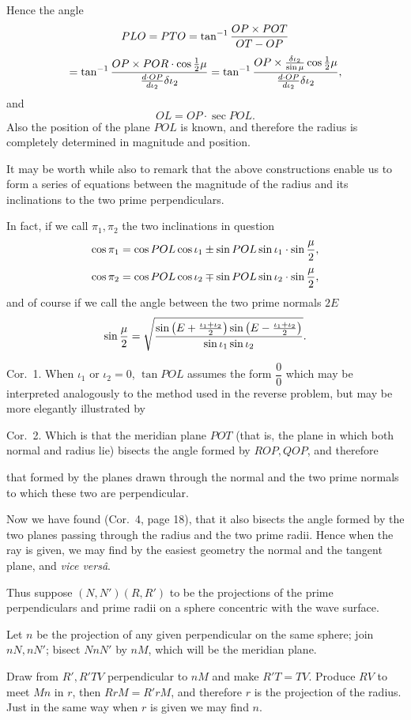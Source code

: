 \documentclass[11pt]{article}
\newcommand{\sourcepage}[1]{\marginpar{\scriptsize p.~#1}}
\begin{document}
Hence the angle
\[
 PLO=PTO=\tan^{-1}{OP\times POT\over OT-OP}
\]
\[
 =\tan^{-1}{OP\times POR\cdot\cos {1\over2}\mu\over {d\cdot OP\over d\iota_2}\delta\iota_2}
 =\tan^{-1}{OP\times {\delta\iota_2\over\sin\mu}\cos {1\over2}\mu\over {d\cdot OP\over d\iota_2}\delta\iota_2},
\]
and
\[
 OL=OP\cdot \sec POL.
\]
Also the position of the plane $POL$ is known, and therefore the radius is completely determined in magnitude and position.

It may be worth while also to remark that the above constructions enable us to form a series of equations between the magnitude of the radius and its inclinations to the two prime perpendiculars.

In fact, if we call $\pi_1,\pi_2$ the two inclinations in question
\[
 \cos\pi_1=\cos POL\cos\iota_1\pm\sin POL\sin\iota_1\cdot\sin{\mu\over2},
\]
\[
 \cos\pi_2=\cos POL\cos\iota_2\mp\sin POL\sin\iota_2\cdot\sin{\mu\over2},
\]
and of course if we call the angle between the two prime normals $2E$
\[
 \sin{\mu\over2}=\sqrt{\frac{
 \sin\left(E+{\iota_1+\iota_2\over2}\right)
 \sin\left(E-{\iota_1+\iota_2\over2}\right)}
 {\sin\iota_1\sin\iota_2}}.
\]

Cor.~1. When $\iota_1$ or $\iota_2=0$, $\tan POL$ assumes the form $\dfrac00$ which may be interpreted analogously to the method used in the reverse problem, but may be more elegantly illustrated by

Cor.~2. Which is that the meridian plane $POT$ (that is, the plane in which both normal and radius lie) bisects the angle formed by $ROP,QOP$, and therefore

\sourcepage{22}
that formed by the planes drawn through the normal and the two prime normals to which these two are perpendicular.

Now we have found (Cor.~4, page 18), that it also bisects the angle formed by the two planes passing through the radius and the two prime radii. Hence when the ray is given, we may find by the easiest geometry the normal and the tangent plane, and \emph{vice versâ}.

Thus suppose $(N,N')(R,R')$ to be the projections of the prime perpendiculars and prime radii on a sphere concentric with the wave surface.

Let $n$ be the projection of any given perpendicular on the same sphere; join $nN,nN'$; bisect $NnN'$ by $nM$, which will be the meridian plane.

Draw from $R',R'TV$ perpendicular to $nM$ and make $R'T=TV$. Produce $RV$ to meet $Mn$ in $r$, then $RrM=R'rM$, and therefore $r$ is the projection of the radius. Just in the same way when $r$ is given we may find $n$.
\end{document}
